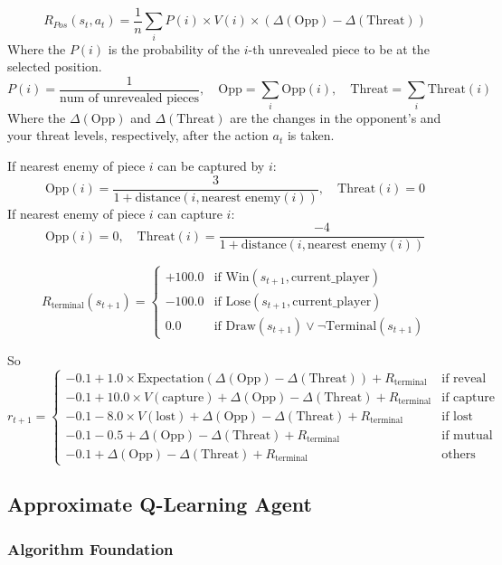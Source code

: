 \documentclass{article}
\begin{document}
$$ R_{Pos}(s_t,a_t) = \frac{1}{n}\sum_i P(i) \times V(i) \times (\Delta(\text{Opp}) - \Delta(\text{Threat})) $$
Where the $P(i)$ is the probability of the $i$-th unrevealed piece to be at the selected position.
$$ P(i) = \frac{1}{\text{num of unrevealed pieces}}, \quad \text{Opp} = \sum_i \text{Opp}(i), \quad \text{Threat} = \sum_i \text{Threat}(i) $$
Where the $\Delta(\text{Opp})$ and $\Delta(\text{Threat})$ are the changes in the opponent's and your threat levels, respectively, after the action $a_t$ is taken.

If nearest enemy of piece $i$ can be captured by $i$:
$$ \text{Opp}(i) = \frac{3}{1 + \text{distance}(i, \text{nearest enemy}(i))}, \quad \text{Threat}(i) = 0 $$
If nearest enemy of piece $i$ can capture $i$:
$$ \text{Opp}(i) = 0, \quad \text{Threat}(i) = \frac{-4}{1 + \text{distance}(i, \text{nearest enemy}(i))} $$


$$ R_{\text{terminal}}(s_{t+1}) = \begin{cases}
+100.0 & \text{if Win}(s_{t+1}, \text{current\_player}) \\
-100.0 & \text{if Lose}(s_{t+1}, \text{current\_player}) \\
0.0 & \text{if Draw}(s_{t+1}) \lor \neg\text{Terminal}(s_{t+1})
\end{cases} $$

So
$$ \boxed{r_{t+1} = \begin{cases}
-0.1 + 1.0 \times \text{Expectation}(\Delta(\text{Opp}) - \Delta(\text{Threat})) + R_{\text{terminal}} & \text{if reveal} \\
-0.1 + 10.0 \times V(\text{capture}) + \Delta(\text{Opp}) - \Delta(\text{Threat}) + R_{\text{terminal}} & \text{if capture}\\
-0.1 - 8.0 \times V(\text{lost}) + \Delta(\text{Opp}) - \Delta(\text{Threat}) + R_{\text{terminal}} & \text{if lost} \\
-0.1 - 0.5 + \Delta(\text{Opp}) - \Delta(\text{Threat}) + R_{\text{terminal}} & \text{if mutual destruction} \\
-0.1 + \Delta(\text{Opp}) - \Delta(\text{Threat}) + R_{\text{terminal}} & \text{others}
\end{cases}} $$





\subsection{Approximate Q-Learning Agent}

\subsubsection{Algorithm Foundation}
\end{document}
